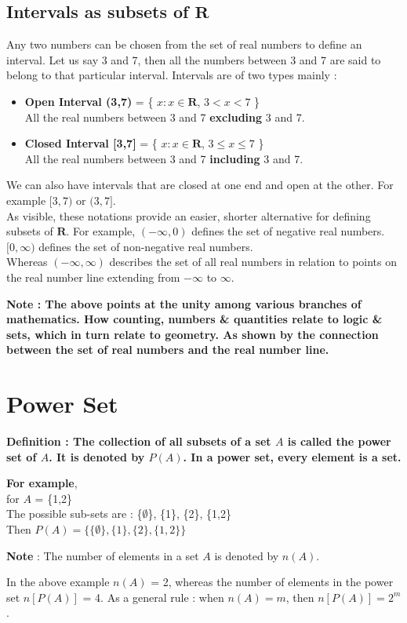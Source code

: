 \documentclass[12pt, letterpaper]{article}
\begin{document}
\subsection{Intervals as subsets of $\mathbf{R}$}
Any two numbers can be chosen from the set of real numbers to define an interval. Let us say 3 and 7, then all the numbers between 3 and 7 are said to belong to that particular interval. Intervals are of two types mainly : 
\begin{itemize}
    \item \textbf{Open Interval (3,7)} = \{ $x : x \in \mathbf{R}$, $3 < x < 7$ \}\\
    All the real numbers between 3 and 7 \textbf{excluding} 3 and 7.
    \item \textbf{Closed Interval [3,7]} = \{ $x : x \in \mathbf{R}$, $3 \leq x \leq 7$ \}\\
    All the real numbers between 3 and 7 \textbf{including} 3 and 7.
\end{itemize}
We can also have intervals that are closed at one end and open at the other. For example $[3,7)$ or $(3,7]$.\\
As visible, these notations provide an easier, shorter alternative for defining subsets of $\mathbf{R}$. For example, $(-\infty,0)$ defines the set of negative real numbers. $[0,\infty)$ defines the set of non-negative real numbers.\\
Whereas $(-\infty,\infty)$ describes the set of all real numbers in relation to points on the real number line extending from $-\infty$ to $\infty$.
\begin{displayquote}
\textbf{Note : The above points at the unity among various branches of mathematics. How counting, numbers \& quantities relate to logic \& sets, which in turn relate to geometry. As shown by the connection between the set of real numbers and the real number line.}
\end{displayquote}


\section{Power Set}
\begin{displayquote}
\textbf{Definition : The collection of all subsets of a set $A$ is called the power set of $A$. It is denoted by $P(A)$. In a power set, every element is a set.}
\end{displayquote}
\textbf{For example},\\ 
for $A$ = \{1,2\}\\
The possible sub-sets are : \{$\emptyset$\}, \{1\}, \{2\}, \{1,2\}\\ 
Then $P(A) = \{\{\emptyset\}, \{1\}, \{2\}, \{1,2\}\}$
\begin{displayquote}
\textbf{Note} : The number of elements in a set $A$ is denoted by $n(A)$.
\end{displayquote}
In the above example $n(A)$ = 2, whereas the number of elements in the power set $n[P(A)]$ = 4. As a general rule : when $n(A) = m$, then $n[P(A)] = 2^m$. 
\end{document}
